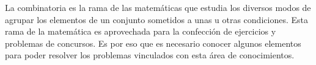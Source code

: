 La combinatoria es la rama de las matemáticas que estudia los diversos modos de agrupar los elementos de un conjunto sometidos a unas u otras condiciones. Esta rama de la matemática es aprovechada para la confección de ejercicios y problemas de concursos. Es por eso que es necesario conocer algunos elementos para poder resolver los problemas vinculados con esta área de conocimientos.